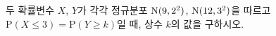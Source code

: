 두 확률변수 $X$, $Y$가 각각 정규분포 $\mathrm{N}(9{,}\mkern3mu\mathopen{}2^2)$, $\mathrm{N}(12{,}\mkern3mu\mathopen{}3^2)$을 따르고 $\mathrm{P}(X\le 3)=\mathrm{P}(Y\ge k)$일 때, 상수 $k$의 값을 구하시오.

